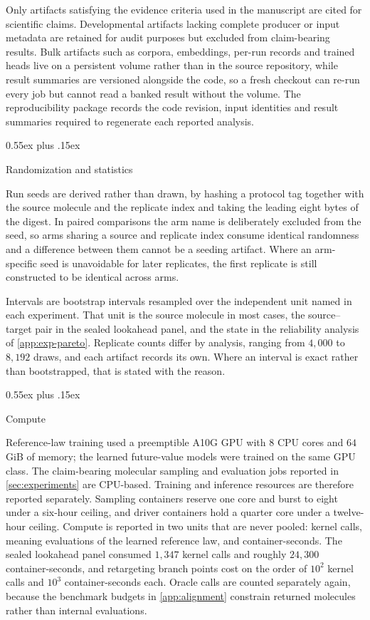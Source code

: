 \documentclass{article}
\makeatletter
\theoremstyle{definition}
\theoremstyle{remark}
\def\subsection{\@startsection{subsection}{2}{\z@}{-1.2ex plus -0.4ex minus -.2ex}%
  {0.55ex plus .15ex}{\normalsize\sc\raggedright}}
\makeatother
\begin{document}
Only artifacts satisfying the evidence criteria used in the manuscript are cited for scientific claims. Developmental artifacts lacking complete producer or input metadata are retained for audit purposes but excluded from claim-bearing results. Bulk artifacts such as corpora, embeddings, per-run records and trained heads live on a persistent volume rather than in the source repository, while result summaries are versioned alongside the code, so a fresh checkout can re-run every job but cannot read a banked result without the volume. The reproducibility package records the code revision, input identities and result summaries required to regenerate each reported analysis.

\subsection{Randomization and statistics}

Run seeds are derived rather than drawn, by hashing a protocol tag together with the source molecule and the replicate index and taking the leading eight bytes of the digest. In paired comparisons the arm name is deliberately excluded from the seed, so arms sharing a source and replicate index consume identical randomness and a difference between them cannot be a seeding artifact. Where an arm-specific seed is unavoidable for later replicates, the first replicate is still constructed to be identical across arms.

Intervals are bootstrap intervals resampled over the independent unit named in each experiment. That unit is the source molecule in most cases, the source--target pair in the sealed lookahead panel, and the state in the reliability analysis of \cref{app:exp-pareto}. Replicate counts differ by analysis, ranging from $4{,}000$ to $8{,}192$ draws, and each artifact records its own. Where an interval is exact rather than bootstrapped, that is stated with the reason.

\subsection{Compute}

Reference-law training used a preemptible A10G GPU with $8$ CPU cores and $64$\,GiB of memory; the learned future-value models were trained on the same GPU class. The claim-bearing molecular sampling and evaluation jobs reported in \cref{sec:experiments} are CPU-based. Training and inference resources are therefore reported separately. Sampling containers reserve one core and burst to eight under a six-hour ceiling, and driver containers hold a quarter core under a twelve-hour ceiling. Compute is reported in two units that are never pooled: kernel calls, meaning evaluations of the learned reference law, and container-seconds. The sealed lookahead panel consumed $1{,}347$ kernel calls and roughly $24{,}300$ container-seconds, and retargeting branch points cost on the order of $10^2$ kernel calls and $10^3$ container-seconds each. Oracle calls are counted separately again, because the benchmark budgets in \cref{app:alignment} constrain returned molecules rather than internal evaluations.
\end{document}
